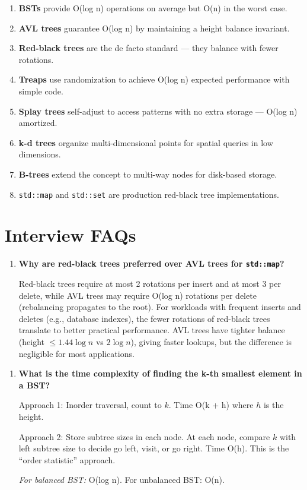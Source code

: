 \begin{enumerate}
\item \textbf{BSTs} provide O(log n) operations on average but O(n) in the worst case.
\item \textbf{AVL trees} guarantee O(log n) by maintaining a height balance invariant.
\item \textbf{Red-black trees} are the de facto standard — they balance with fewer rotations.
\item \textbf{Treaps} use randomization to achieve O(log n) expected performance with simple code.
\item \textbf{Splay trees} self-adjust to access patterns with no extra storage — O(log n) amortized.
\item \textbf{k-d trees} organize multi-dimensional points for spatial queries in low dimensions.
\item \textbf{B-trees} extend the concept to multi-way nodes for disk-based storage.
\item \texttt{std::map} and \texttt{std::set} are production red-black tree implementations.
\end{enumerate}

\section{Interview FAQs}

\begin{enumerate}
\item \textbf{Why are red-black trees preferred over AVL trees for \texttt{std::map}?}

Red-black trees require at most 2 rotations per insert and at most 3 per delete, while AVL trees may require O(log n) rotations per delete (rebalancing propagates to the root). For workloads with frequent inserts and deletes (e.g., database indexes), the fewer rotations of red-black trees translate to better practical performance. AVL trees have tighter balance (height $\leq 1.44 \log n$ vs $2 \log n$), giving faster lookups, but the difference is negligible for most applications.
\end{enumerate}

\begin{enumerate}
\item \textbf{What is the time complexity of finding the k-th smallest element in a BST?}

Approach 1: Inorder traversal, count to $k$. Time O(k + h) where $h$ is the height. 

Approach 2: Store subtree sizes in each node. At each node, compare $k$ with left subtree size to decide go left, visit, or go right. Time O(h). This is the ``order statistic'' approach.

\textit{For balanced BST:} O(log n). For unbalanced BST: O(n).
\end{enumerate}

